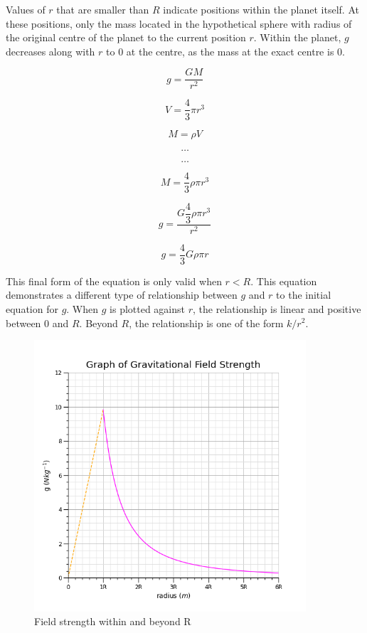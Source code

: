 \documentclass[12pt]{article}
\begin{document}
Values of \(r\) that are smaller than \(R\) indicate positions within the planet itself. At these positions, only the mass located in the hypothetical sphere with radius of the original centre of the planet to the current position \(r\). Within the planet, \(g\) decreases along with \(r\) to 0 at the centre, as the mass at the exact centre is 0.

\begin{figure}[H]
\centering
\begin{minipage}{.8\textwidth}
\begin{tcolorbox}[
sharp corners=all,
colback=white,
colframe=white,
size=tight,
boxrule=0.2mm,
left=10mm, right=10mm
]
\begin{multicols}{2}
\noindent

\[g = \dfrac{GM}{r^2}\]

\[V = \dfrac{4}{3} \pi r^3\]

\[M = \rho V\]

\[\textbf{\ldots}\]
\columnbreak

\[\textbf{\ldots}\]

\[M = \dfrac{4}{3} \rho \pi r^3\]

\[g = \dfrac{G \dfrac{4}{3} \rho \pi r^3}{r^2}\]

\[g = \dfrac{4}{3} G \rho \pi r\]
\end{multicols}
\end{tcolorbox}
\end{minipage}
\end{figure}

This final form of the equation is only valid when \(r < R\). This equation demonstrates a different type of relationship between \(g\) and \(r\) to the initial equation for \(g\). When \(g\) is plotted against \(r\), the relationship is linear and positive between \(0\) and \(R\). Beyond \(R\), the relationship is one of the form \(k/r^2\).

\begin{figure}[H]
\centering
\includegraphics[width=0.9\textwidth,keepaspectratio]{./images/gravitational_field_strength.png}
\caption{Field strength within and beyond R}
\end{figure}
\end{document}
